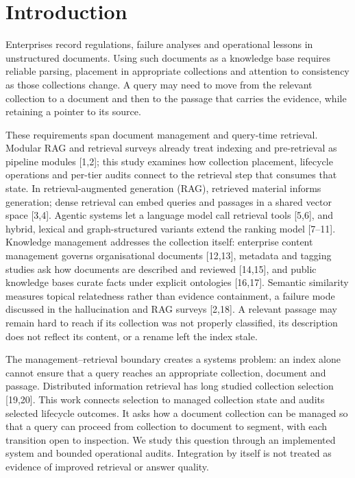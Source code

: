 \documentclass[11pt]{article}
\begin{document}
\vspace{1em}

\section{Introduction}


Enterprises record regulations, failure analyses and operational lessons in
unstructured documents. Using such documents as a knowledge base requires
reliable parsing, placement in appropriate collections and attention to
consistency as those collections change.
A query may need to move from the relevant collection to a document and then
to the passage that carries the evidence, while retaining a pointer to its
source.

These requirements span document management and query-time retrieval.
Modular RAG and retrieval surveys already treat indexing and pre-retrieval as
pipeline modules [1,2]; this study examines how
collection placement, lifecycle operations and per-tier audits connect to the
retrieval step that consumes that state. In retrieval-augmented generation
(RAG), retrieved material informs generation; dense retrieval can embed queries
and passages in a shared vector space [3,4]. Agentic systems let a language
model call retrieval tools [5,6], and hybrid, lexical
and graph-structured variants extend the ranking model
[7--11]. Knowledge management
addresses the collection itself: enterprise content management governs
organisational documents [12,13],
metadata and tagging studies ask how documents are described and reviewed
[14,15], and public knowledge
bases curate facts under explicit ontologies
[16,17]. Semantic similarity
measures topical relatedness rather than evidence containment, a failure mode
discussed in the hallucination and RAG surveys [2,18].
A relevant passage may remain hard to reach if its collection was not
properly classified, its description does not reflect its content, or a
rename left the index stale.

The management--retrieval boundary creates a systems problem: an index alone
cannot ensure that a query reaches an appropriate collection, document and
passage. Distributed information retrieval has long studied collection
selection [19,20]. This work connects selection
to managed collection state and audits selected lifecycle outcomes. It asks how
a document collection can be managed so that a query can proceed from
collection to document to segment, with each transition open to inspection.
We study this question through an implemented system and bounded operational
audits. Integration by itself is not treated as evidence of improved retrieval
or answer quality.
\end{document}
